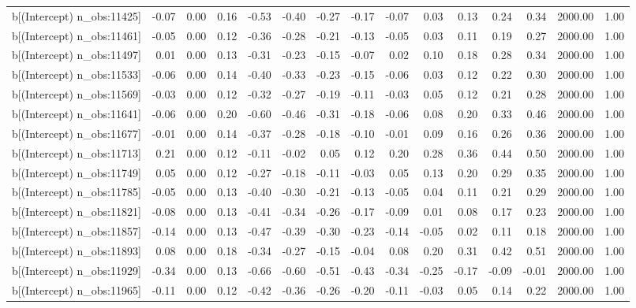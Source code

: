 \begin{table}[ht]
\begin{tabular}{rrrrrrrrrrrrrrr}
  b[(Intercept) n\_obs:11425] & -0.07 & 0.00 & 0.16 & -0.53 & -0.40 & -0.27 & -0.17 & -0.07 & 0.03 & 0.13 & 0.24 & 0.34 & 2000.00 & 1.00 \\ 
  b[(Intercept) n\_obs:11461] & -0.05 & 0.00 & 0.12 & -0.36 & -0.28 & -0.21 & -0.13 & -0.05 & 0.03 & 0.11 & 0.19 & 0.27 & 2000.00 & 1.00 \\ 
  b[(Intercept) n\_obs:11497] & 0.01 & 0.00 & 0.13 & -0.31 & -0.23 & -0.15 & -0.07 & 0.02 & 0.10 & 0.18 & 0.28 & 0.34 & 2000.00 & 1.00 \\ 
  b[(Intercept) n\_obs:11533] & -0.06 & 0.00 & 0.14 & -0.40 & -0.33 & -0.23 & -0.15 & -0.06 & 0.03 & 0.12 & 0.22 & 0.30 & 2000.00 & 1.00 \\ 
  b[(Intercept) n\_obs:11569] & -0.03 & 0.00 & 0.12 & -0.32 & -0.27 & -0.19 & -0.11 & -0.03 & 0.05 & 0.12 & 0.21 & 0.28 & 2000.00 & 1.00 \\ 
  b[(Intercept) n\_obs:11641] & -0.06 & 0.00 & 0.20 & -0.60 & -0.46 & -0.31 & -0.18 & -0.06 & 0.08 & 0.20 & 0.33 & 0.46 & 2000.00 & 1.00 \\ 
  b[(Intercept) n\_obs:11677] & -0.01 & 0.00 & 0.14 & -0.37 & -0.28 & -0.18 & -0.10 & -0.01 & 0.09 & 0.16 & 0.26 & 0.36 & 2000.00 & 1.00 \\ 
  b[(Intercept) n\_obs:11713] & 0.21 & 0.00 & 0.12 & -0.11 & -0.02 & 0.05 & 0.12 & 0.20 & 0.28 & 0.36 & 0.44 & 0.50 & 2000.00 & 1.00 \\ 
  b[(Intercept) n\_obs:11749] & 0.05 & 0.00 & 0.12 & -0.27 & -0.18 & -0.11 & -0.03 & 0.05 & 0.13 & 0.20 & 0.29 & 0.35 & 2000.00 & 1.00 \\ 
  b[(Intercept) n\_obs:11785] & -0.05 & 0.00 & 0.13 & -0.40 & -0.30 & -0.21 & -0.13 & -0.05 & 0.04 & 0.11 & 0.21 & 0.29 & 2000.00 & 1.00 \\ 
  b[(Intercept) n\_obs:11821] & -0.08 & 0.00 & 0.13 & -0.41 & -0.34 & -0.26 & -0.17 & -0.09 & 0.01 & 0.08 & 0.17 & 0.23 & 2000.00 & 1.00 \\ 
  b[(Intercept) n\_obs:11857] & -0.14 & 0.00 & 0.13 & -0.47 & -0.39 & -0.30 & -0.23 & -0.14 & -0.05 & 0.02 & 0.11 & 0.18 & 2000.00 & 1.00 \\ 
  b[(Intercept) n\_obs:11893] & 0.08 & 0.00 & 0.18 & -0.34 & -0.27 & -0.15 & -0.04 & 0.08 & 0.20 & 0.31 & 0.42 & 0.51 & 2000.00 & 1.00 \\ 
  b[(Intercept) n\_obs:11929] & -0.34 & 0.00 & 0.13 & -0.66 & -0.60 & -0.51 & -0.43 & -0.34 & -0.25 & -0.17 & -0.09 & -0.01 & 2000.00 & 1.00 \\ 
  b[(Intercept) n\_obs:11965] & -0.11 & 0.00 & 0.12 & -0.42 & -0.36 & -0.26 & -0.20 & -0.11 & -0.03 & 0.05 & 0.14 & 0.22 & 2000.00 & 1.00 \\ 

\end{tabular}
\end{table}
